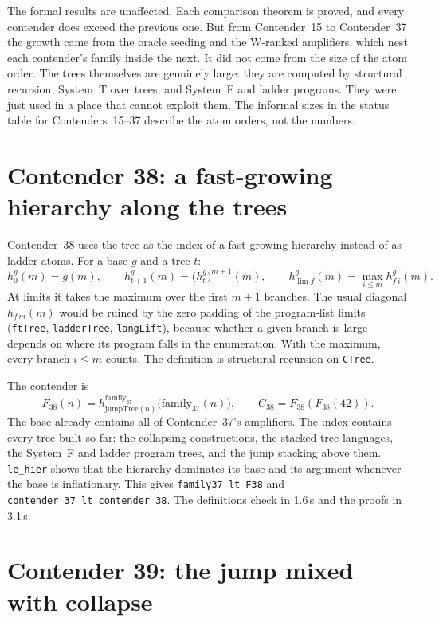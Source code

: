 \documentclass[11pt]{article}
\theoremstyle{definition}
\theoremstyle{remark}
\newcommand{\lean}[1]{\texttt{#1}}
\begin{document}
The formal results are unaffected. Each comparison theorem is proved, and every
contender does exceed the previous one. But from Contender~15 to Contender~37 the
growth came from the oracle seeding and the W-ranked amplifiers, which nest
each contender's family inside the next. It did not come from the size of the
atom order. The trees themselves are genuinely large: they are computed by
structural recursion, System~T over trees, and System~F and ladder programs.
They were just used in a place that cannot exploit them. The informal sizes in
the status table for Contenders~15--37 describe the atom orders, not the
numbers.

\section{Contender 38: a fast-growing hierarchy along the trees}

Contender~38 uses the tree as the index of a fast-growing hierarchy instead of
as ladder atoms. For a base $g$ and a tree $t$:
\[
h^g_{0}(m)=g(m),\qquad h^g_{t+1}(m)=\bigl(h^g_t\bigr)^{m+1}(m),\qquad
h^g_{\lim f}(m)=\max_{i\le m} h^g_{f\,i}(m).
\]
At limits it takes the maximum over the first $m{+}1$ branches. The usual
diagonal $h_{f\,m}(m)$ would be ruined by the zero padding of the
program-list limits (\lean{ftTree}, \lean{ladderTree}, \lean{langLift}),
because whether a given branch is large depends on where its program falls in
the enumeration. With the maximum, every branch $i\le m$ counts. The definition
is structural recursion on \lean{CTree}.

The contender is
\[
F_{38}(n)=h^{\mathrm{family}_{37}}_{\mathrm{jumpTree}(n)}\bigl(\mathrm{family}_{37}(n)\bigr),
\qquad C_{38}=F_{38}(F_{38}(42)).
\]
The base already contains all of Contender~37's amplifiers. The index contains
every tree built so far: the collapsing constructions, the stacked tree
languages, the System~F and ladder program trees, and the jump stacking above
them. \lean{le\_hier} shows that the hierarchy dominates its base and its
argument whenever the base is inflationary. This gives
\lean{family37\_lt\_F38} and \lean{contender\_37\_lt\_\allowbreak contender\_38}.
The definitions check in 1.6\,s and the proofs in 3.1\,s.

\section{Contender 39: the jump mixed with collapse}
\end{document}
